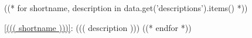 ((* for shortname, description in data.get('descriptions').items() *))
\item \ref{((( shortname )))}: ((( description )))
((* endfor *))
